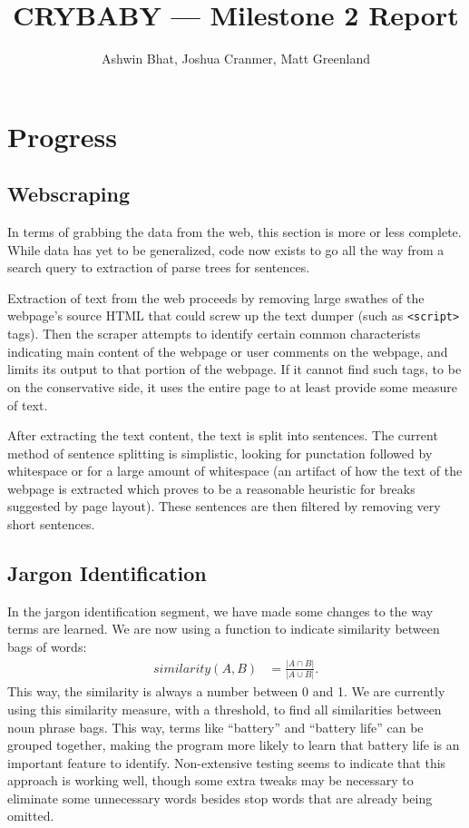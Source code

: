 \documentclass{article}
\title{CRYBABY --- Milestone 2 Report}
\author{Ashwin Bhat, Joshua Cranmer, Matt Greenland}
\begin{document}
\maketitle
\tableofcontents

\section{Progress} %

\subsection{Webscraping}

In terms of grabbing the data from the web, this section is more or less
complete. While data has yet to be generalized, code now exists to go all the
way from a search query to extraction of parse trees for sentences.

Extraction of text from the web proceeds by removing large swathes of the
webpage's source HTML that could screw up the text dumper (such as
\texttt{<script>} tags). Then the scraper attempts to identify certain common
characterists indicating main content of the webpage or user comments on the
webpage, and limits its output to that portion of the webpage. If it cannot
find such tags, to be on the conservative side, it uses the entire page to at
least provide some measure of text.

After extracting the text content, the text is split into sentences. The current
method of sentence splitting is simplistic, looking for punctation followed by
whitespace or for a large amount of whitespace (an artifact of how the text of
the webpage is extracted which proves to be a reasonable heuristic for breaks
suggested by page layout). These sentences are then filtered by removing very
short sentences.

\subsection{Jargon Identification} %

In the jargon identification segment, we have made some changes to the way terms are learned.  We are now using a function to indicate similarity between bags of words:\begin{align*}
	similarity(A, B) &= \frac{|A\cap B|}{|A\cup B|}.
\end{align*}This way, the similarity is always a number between 0 and 1.  We are currently using this similarity measure, with a threshold, to find all similarities between noun phrase bags.  This way, terms like ``battery'' and ``battery life'' can be grouped together, making the program more likely to learn that battery life is an important feature to identify.  Non-extensive testing seems to indicate that this approach is working well, though some extra tweaks may be necessary to eliminate some unnecessary words besides stop words that are already being omitted.
\end{document}
